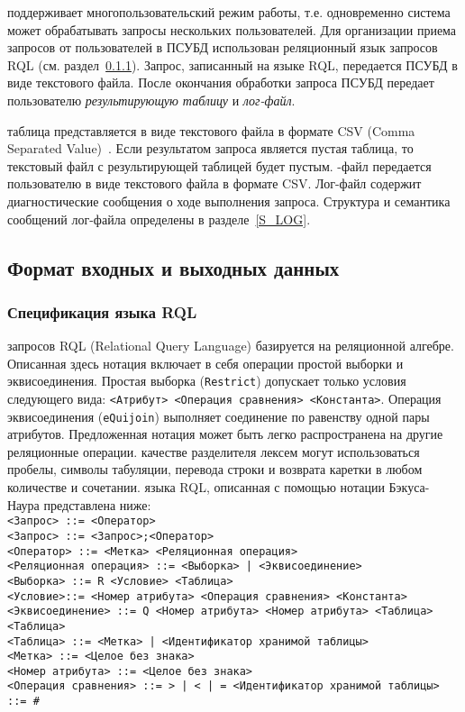 \documentclass[11pt,oneside]{article}
\begin{document}
	 поддерживает многопользовательский режим работы, т.е. одновременно система может обрабатывать запросы нескольких пользователей.
	Для организации приема запросов от пользователей в ПСУБД использован реляционный язык запросов RQL (см. раздел~\ref{S_RQL}). Запрос, записанный на языке RQL, передается ПСУБД в виде текстового файла. После окончания обработки запроса ПСУБД передает пользователю \textit{результирующую таблицу} и \textit{лог-файл}.
	
	 таблица представляется в виде текстового файла в формате CSV (Comma Separated Value)~\cite{B_RFC4180}. Если результатом запроса является пустая таблица, то текстовый файл с результирующей таблицей будет пустым.
	-файл передается пользователю в виде текстового файла в формате CSV. Лог-файл содержит диагностические сообщения о ходе выполнения запроса. Структура и семантика сообщений лог-файла определены в разделе~\ref{S_LOG}.
	
	\subsection{Формат входных и выходных данных}\label{S_InOutData}
	\subsubsection{Спецификация языка RQL}\label{S_RQL}
	 запросов RQL (Relational Query Language) базируется на реляционной алгебре. Описанная здесь нотация включает в себя операции простой выборки и эквисоединения. Простая выборка (\texttt{Restrict}) допускает только условия следующего вида: \texttt{<Атрибут> <Операция сравнения> <Константа>}. Операция эквисоединения (\texttt{eQuijoin}) выполняет соединение по равенству одной пары атрибутов. Предложенная нотация может быть легко распространена на другие реляционные операции.
	 качестве разделителя лексем могут использоваться пробелы, символы табуляции, перевода строки и возврата каретки в любом количестве и сочетании.
	 языка RQL, описанная с помощью нотации Бэкуса-Наура представлена ниже:\\
	\texttt{<Запрос> ::= <Оператор>\\
		<Запрос> ::= <Запрос>;<Оператор>\\
		<Оператор> ::= <Метка> <Реляционная операция>\\
		<Реляционная операция> ::= <Выборка> | <Эквисоединение>\\
		<Выборка> ::= R <Условие> <Таблица>\\
		<Условие>::= <Номер атрибута> <Операция сравнения> <Константа>\\
		<Эквисоединение> ::= Q <Номер атрибута> <Номер атрибута> <Таблица> <Таблица>\\
		<Таблица> ::= <Метка> | <Идентификатор хранимой таблицы>\\
		<Метка> ::= <Целое без знака>\\
		<Номер атрибута> ::= <Целое без знака>\\
		<Операция сравнения> ::= > | < | = <Идентификатор хранимой таблицы> ::= \#<Целое без знака>
	}
	
\end{document}
